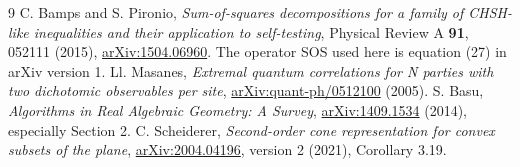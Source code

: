 \begin{thebibliography}{9}
 C. Bamps and S. Pironio,
\emph{Sum-of-squares decompositions for a family of CHSH-like inequalities and their application to self-testing},
Physical Review A \textbf{91}, 052111 (2015),
\href{https://arxiv.org/abs/1504.06960}{arXiv:1504.06960}.
The operator SOS used here is equation (27) in arXiv version 1.
 Ll. Masanes,
\emph{Extremal quantum correlations for N parties with two dichotomic observables per site},
\href{https://arxiv.org/abs/quant-ph/0512100}{arXiv:quant-ph/0512100} (2005).
 S. Basu,
\emph{Algorithms in Real Algebraic Geometry: A Survey},
\href{https://arxiv.org/abs/1409.1534}{arXiv:1409.1534} (2014), especially Section 2.
 C. Scheiderer,
\emph{Second-order cone representation for convex subsets of the plane},
\href{https://arxiv.org/abs/2004.04196}{arXiv:2004.04196}, version 2 (2021), Corollary 3.19.
\end{thebibliography}
